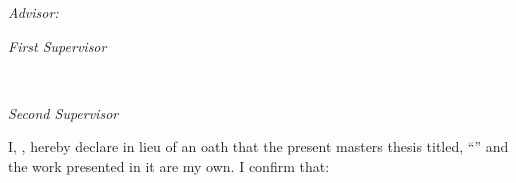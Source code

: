 \begin{titlepage}
\vfill\vfill\vfill
{ \large \center 
\textit{Advisor:}\\
\Advisor
}
\vfill
    \begin{minipage}{0.48\textwidth}
\begin{flushleft}
\large
\textit{First Supervisor}\\
\FirstSupervisor
\end{flushleft}
\end{minipage}
~
\begin{minipage}{0.48\textwidth}
\begin{flushright}
\large
\textit{Second Supervisor}\\
\SecondSupervisor
\end{flushright}
\end{minipage}

 
\vfill %
\end{titlepage}



\vfill
\noindent I, \AuthorofThesis, hereby declare in lieu of an oath that the present masters thesis titled, \enquote{\TitleofThesis{}} and the work presented in it are my own. I confirm that:

